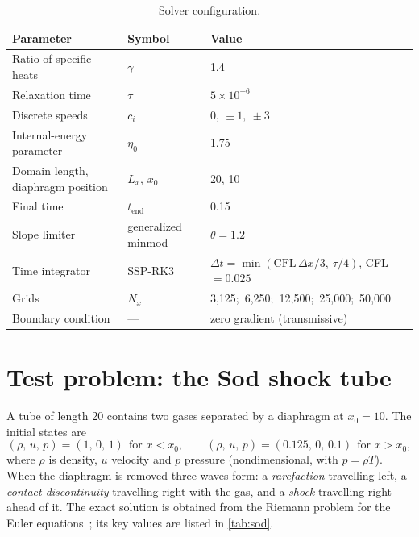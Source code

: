 \documentclass[11pt]{article}
\begin{document}
\begin{table}[H]
\centering
\caption{Solver configuration.}
\label{tab:config}
\small
\begin{tabular}{@{}lll@{}}
\toprule
Parameter & Symbol & Value \\
\midrule
Ratio of specific heats & $\gamma$ & 1.4 \\
Relaxation time & $\tau$ & $5\times10^{-6}$ \\
Discrete speeds & $c_i$ & $0,\ \pm1,\ \pm3$ \\
Internal-energy parameter & $\eta_0$ & 1.75 \\
Domain length, diaphragm position & $L_x$, $x_0$ & 20, 10 \\
Final time & $t_{\mathrm{end}}$ & 0.15 \\
Slope limiter & generalized minmod & $\theta = 1.2$ \\
Time integrator & SSP-RK3 & $\Delta t = \min(\mathrm{CFL}\,\Delta x/3,\ \tau/4)$, CFL $=0.025$ \\
Grids & $N_x$ & 3{,}125;\ 6{,}250;\ 12{,}500;\ 25{,}000;\ 50{,}000 \\
Boundary condition & --- & zero gradient (transmissive) \\
\bottomrule
\end{tabular}
\end{table}

\section{Test problem: the Sod shock tube}
\label{sec:sod}

A tube of length 20 contains two gases separated by a diaphragm at $x_0 = 10$.  The
initial states are
\[
(\rho,\,u,\,p) = (1,\,0,\,1) \ \ \text{for } x<x_0,
\qquad
(\rho,\,u,\,p) = (0.125,\,0,\,0.1) \ \ \text{for } x>x_0,
\]
where $\rho$ is density, $u$ velocity and $p$ pressure (nondimensional, with $p=\rho T$).
When the diaphragm is removed three waves form: a \emph{rarefaction} travelling left, a
\emph{contact discontinuity} travelling right with the gas, and a \emph{shock} travelling
right ahead of it.  The exact solution is obtained from the Riemann problem for the Euler
equations~\citep{Toro2009}; its key values are listed in \cref{tab:sod}.
\end{document}

